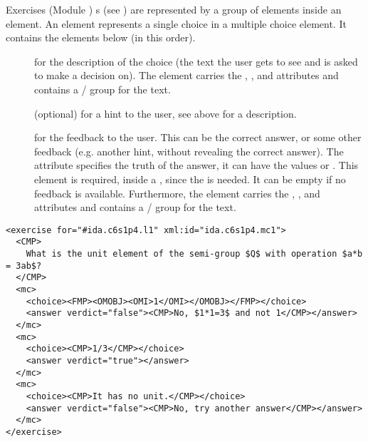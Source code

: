 \begin{tchapter}[id=quiz,short=Exercises]{Exercises (Module {})}
{s} (see {}) are represented by a
group of {} elements inside an {} element.  An {}
element represents a single choice in a multiple choice element. It contains the elements
below (in this order).
\begin{description}
\item[{}] for the description of the choice (the text the user gets to see
  and is asked to make a decision on). The {} element carries the
  {}, {}, and
  {} attributes and contains a {}/{} group
  for the text.
\item[{}] (optional) for a hint to the user, see above for a description.
\item[{}] for the feedback to the user. This can be the correct answer, or
  some other feedback (e.g. another hint, without revealing the correct answer).  The
  {} attribute specifies the truth of the answer, it can have
  the values {} or {}. This
  element is required, inside a {}, since the {} is
  needed. It can be empty if no feedback is available. Furthermore, the {}
  element carries the {}, {}, and
  {} attributes and contains a {}/{} group
  for the text.
\end{description}

\begin{lstlisting}[label=lst:exercise,mathescape,
  caption={A Multiple-Choice Exercise in {\omdoc}},
  index={exercise,mc,choice,answer}]
<exercise for="#ida.c6s1p4.l1" xml:id="ida.c6s1p4.mc1">
  <CMP>
    What is the unit element of the semi-group $Q$ with operation $a*b = 3ab$?
  </CMP> 
  <mc>
    <choice><FMP><OMOBJ><OMI>1</OMI></OMOBJ></FMP></choice>
    <answer verdict="false"><CMP>No, $1*1=3$ and not 1</CMP></answer>
  </mc>
  <mc>
    <choice><CMP>1/3</CMP></choice>
    <answer verdict="true"></answer>
  </mc>
  <mc>
    <choice><CMP>It has no unit.</CMP></choice>
    <answer verdict="false"><CMP>No, try another answer</CMP></answer>
  </mc>
</exercise>
\end{lstlisting}
\end{tchapter}



